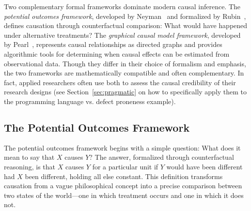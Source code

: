 Two complementary formal frameworks dominate modern causal inference.
The \emph{potential outcomes framework}, developed by Neyman~\cite{neyman1923application} and formalized by Rubin~\cite{rubin1974estimating}, defines causation through counterfactual comparison: What would have happened under alternative treatments?
The \emph{graphical causal model framework}, developed by Pearl~\cite{pearl2009causality}, represents causal relationships as directed graphs and provides algorithmic tools for determining when causal effects can be estimated from observational data.
Though they differ in their choice of formalism and emphasis, the two frameworks are mathematically compatible and often complementary.
In fact, applied researchers often use both to assess the causal credibility of their research designs (see Section~\ref{sec:pragmatic} on how to specifically apply them to the programming language vs. defect proneness example).

\subsection{The Potential Outcomes Framework}

The potential outcomes framework begins with a simple question: What does it mean to say that $X$ causes $Y$?
The answer, formalized through counterfactual reasoning, is that $X$ causes $Y$ for a particular unit if $Y$ would have been different had $X$ been different, holding all else constant.
This definition transforms causation from a vague philosophical concept into a precise comparison between two states of the world---one in which treatment occurs and one in which it does not.

